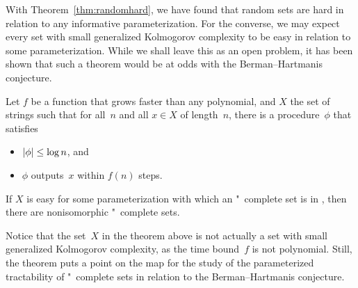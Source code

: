 With Theorem~\ref{thm:randomhard}, we have found that random sets are hard in relation to any informative parameterization.
For the converse, we may expect every set with small generalized Kolmogorov complexity to be easy in relation to some parameterization.
While we shall leave this as an open problem, it has been shown that such a theorem would be at odds with the Berman--Hartmanis conjecture.
\begin{theorem}
\label{thm:simpleeasy}%
  Let $f$ be a function that grows faster than any polynomial, and $X$ the set of strings such that for all~$n$ and all $x \in X$ of length~$n$, there is a procedure~$\phi$ that satisfies
  \begin{itemize}
  \item ${\lvert\phi\rvert} \le \log n$, and
  \item $\phi$ outputs~$x$ within $f(n)$ steps.
  \end{itemize}
  If $X$ is easy for some parameterization with which an "~complete set is in , then there are nonisomorphic "~complete sets.
\end{theorem}

Notice that the set~$X$ in the theorem above is not actually a set with small generalized Kolmogorov complexity, as the time bound~$f$ is not polynomial.
Still, the theorem puts a point on the map for the study of the parameterized tractability of "~complete sets in relation to the Berman--Hartmanis conjecture.
